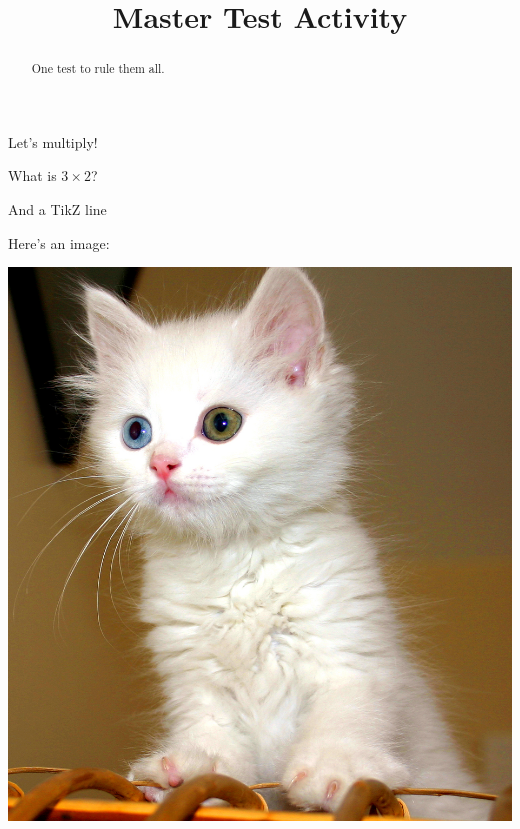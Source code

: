 \documentclass{ximera}
\title{Master Test Activity}
\begin{document}
\begin{abstract}
  One test to rule them all.
\end{abstract}

Let's multiply!
\begin{question}
	What is $3 \times 2$?  
\end{question}

And a TikZ line

\begin{image}
\end{image}

Here's an image:

\begin{image}
	\includegraphics[scale=.01]{testCat.jpg}
\end{image}
\end{document}
